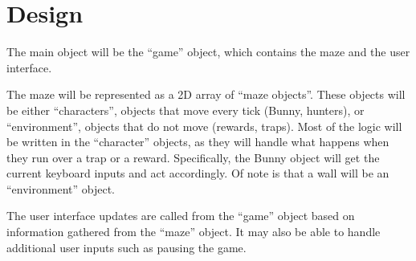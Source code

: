 \documentclass{article}
\begin{document}
\section{Design}

The main object will be the ``game'' object, which contains the maze and the
user interface.

The maze will be represented as a 2D array of ``maze objects''. These objects
will be either ``characters'', objects that move every tick (Bunny, hunters), or
``environment'', objects that do not move (rewards, traps).
Most of the logic will be written in the ``character'' objects, as they will
handle what happens when they run over a trap or a reward.
Specifically, the Bunny object will get the current keyboard inputs and act
accordingly. Of note is that a wall will be an ``environment'' object.

The user interface updates are called from the ``game'' object based on
information gathered from the ``maze'' object. It may also be able to handle
additional user inputs such as pausing the game.
\end{document}
